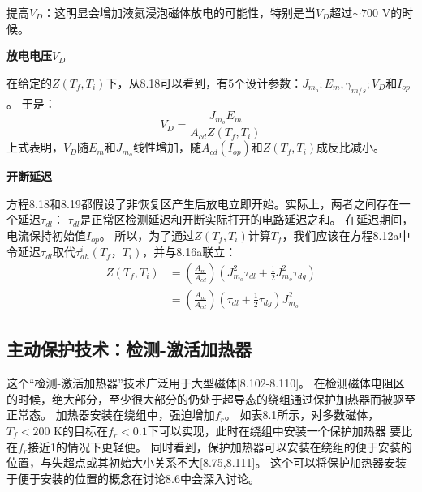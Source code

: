 提高$V_D$：这明显会增加液氦浸泡磁体放电的可能性，特别是当$V_D$超过$\sim 700$ V的时候。

\textbf{放电电压$V_D$}

在给定的$Z(T_f,T_i)$下，从8.18可以看到，有5个设计参数：$J_{m_o};E_m,\gamma_{m/s};V_D$和$I_{op}$。
于是：
\begin{equation}%
V_D=\frac{J_{m_o}E_m}{A_{cd}Z(T_f,T_i)}
\end{equation}
上式表明，$V_D$随$E_m$和$J_{m_o}$线性增加，随$A_{cd}(I_{op})$和$Z(T_f,T_i)$成反比减小。

\textbf{开断延迟}

方程8.18和8.19都假设了非恢复区产生后放电立即开始。实际上，两者之间存在一个延迟$\tau_{dl}$：
$\tau_{dl}$是正常区检测延迟和开断实际打开的电路延迟之和。
在延迟期间，电流保持初始值$I_{op}$。
所以，为了通过$Z(T_f,T_i)$计算$T_f$，我们应该在方程8.12a中令延迟$\tau_{dl}$取代$\tau_{ah}^i(T_f，T_i)$，并与8.16a联立：
\begin{subequations}
	\begin{align}
Z(T_f,T_i)&=\left(\frac{A_m}{A_{cd}}\right)(J_{m_o}^{2}\tau_{dl}+\frac{1}{2}J_{m_o}^{2}\tau_{dg})\\
&=\left(\frac{A_m}{A_{cd}}\right)(\tau_{dl}+\frac{1}{2}\tau_{dg})J_{m_o}^{2}
	\end{align}
\end{subequations}

\subsection{主动保护技术：检测-激活加热器}
这个“检测-激活加热器”技术广泛用于大型磁体[8.102-8.110]。
在检测磁体电阻区的时候，绝大部分，至少很大部分的仍处于超导态的绕组通过保护加热器而被驱至正常态。
加热器安装在绕组中，强迫增加$f_r$。
如表8.1所示，对多数磁体，$T_f<200$ K的目标在$f_r<0.1$下可以实现，此时在绕组中安装一个保护加热器
要比在$f_r$接近1的情况下更轻便。
同时看到，保护加热器可以安装在绕组的便于安装的位置，与失超点或其初始大小关系不大[8.75,8.111]。
这个可以将保护加热器安装于便于安装的位置的概念在讨论8.6中会深入讨论。

